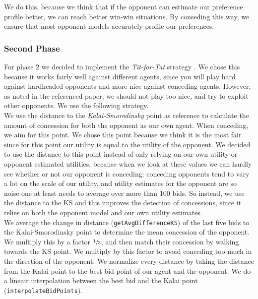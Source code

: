 We do this, because we think that if the opponent can estimate our preference profile better,
we can reach better win-win situations. By conseding this way, we ensure that most opponent 
models accurately profile our preferences.

\subsubsection{Second Phase}

For phase $2$ we decided to implement the \emph{Tit-for-Tat} strategy \cite{titfortat}.
We chose this because it works fairly well against different agents, since you will play
hard against hardheaded opponents and more nice against conceding agents.
However, as noted in the referenced paper, we should not play too nice,
and try to exploit other opponents. We use the following strategy. \\

We use the distance to the \emph{Kalai-Smorodinsky} point as reference to calculate
the amount of concession for both the opponent as our own agent. When conceding, we aim for this point. We chose this point because we think it is the most fair since for this point
our utility is equal to the utility of the opponent.
We decided to use the distance to this point instead of only relying on our own utility 
or opponent estimated utilities, because when we look at these values we can hardly see whether or not our opponent is conceding: conceding opponents tend to vary a lot on the scale of our utility,
and utility estimates for the opponent are so noise one at least needs to average over more than 100 bids. So instead, we use the distance to the KS and this improves the detection of concessions,
since it relies on both the opponent model and our own utility estimates. \\

We average the change in distance (\verb-getAvgDifferenceKS-) of the last five bids to the Kalai-Smorodinsky point to determine the mean concession of the opponent. We
multiply this by a factor $\sfrac{1}{3}$, and then match their concession by walking towards the KS point. We multiply by this factor to avoid conceding too much in the direction of the opponent. 
We normalize every distance by taking the distance from the Kalai point to the best bid point of our agent and the opponent. We do a lineair interpolation between the best bid and the 
Kalai point (\verb-interpolateBidPoints-).
\\

